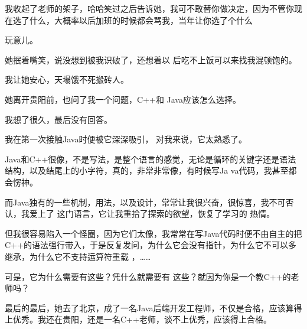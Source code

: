 \documentclass{article}
\begin{document}
我收起了老师的架子，哈哈笑过之后告诉她，我可不敢替你做决定，因为不管你现在选了什么，大概率以后加班的时候都会骂我，当年让你选了个什么

\newpage
玩意儿。 

她抿着嘴笑，说没想到被我识破了，还想着以
后吃不上饭可以来找我混顿饱的。 


我让她安心，天塌饿不死搬砖人。 

她离开贵阳前，也问了我一个问题，C++和
Java应该怎么选择。 


我想了很久，最后没有回答。 

我在第一次接触Java时便被它深深吸引，
对我来说，它太熟悉了。 

Java和C++很像，不是写法，是整个语言的感觉，无论是循环的关键字还是语法结构，以及结尾上的小字符，真的，非常非常像，有时候写Ja
va代码，我甚至都会愣神。 

而Java独有的一些机制，用法，以及设计，常常让我很兴奋，很惊喜，我不可否认，我爱上了
\newpage
这门语言，它让我重拾了探索的欲望，恢复了学习的
热情。 

但我很容易陷入一个怪圈，因为它们太像，我常常在写Java代码时便不由自主的把C++的语法强行带入，于是反复发问，为什么它会没有指针，为什么它不可以多继承，为什么它不支持运算符重载
，…… 

可是，它为什么需要有这些？凭什么就需要有
这些？就因为你是一个教C++的老师吗？ 

最后的最后，她去了北京，成了一名Java后端开发工程师，不仅是合格，应该算得上优秀。我还在贵阳，还是一名C++老师，谈不上优秀，应该得上合格。
\end{document}
